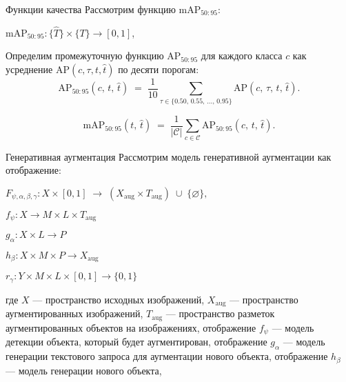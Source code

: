 \documentclass{beamer}
\begin{document}
\begin{frame}{Функции качества}
Рассмотрим функцию $\text{mAP}_{50:95}$:
\begin{center}
   $\text{mAP}_{50:95}:  \{ \hat{T} \}  \times \{ T \} \to [0,1]$,
\end{center}

Определим промежуточную функцию $\text{AP}_{50:95}$ для каждого класса $c$ как усреднение $\text{AP}(c, \tau, t, \hat{t})$ по десяти порогам:
\[
\text{AP}_{50:95}(c,\,t,\,\hat{t})
\;=\;
\frac{1}{10} 
\sum_{\tau \in \{0.50,\,0.55,\,\dots,\,0.95\}}
\text{AP}(c,\,\tau,\,t,\,\hat{t}).
\]

\[
\text{mAP}_{50:95}(t,\,\hat{t})
\;=\;
\frac{1}{|\mathcal{C}|}
\sum_{c \in \mathcal{C}}
\text{AP}_{50:95}(c,\,t,\,\hat{t}).
\]

\end{frame}
\begin{frame}{Генеративная аугментация}
Рассмотрим модель генеративной аугментации как отображение:

\begin{center}

$
F_{\psi,\alpha,\beta,\gamma} : X \times [0,1] \;\longrightarrow\; (X_{\text{aug}} \times T_{\text{aug}}) \;\cup\; \{\varnothing\}, 
$

\end{center}
\begin{center}
$ f_{\psi}: X \to M \times L \times T_{\text{aug}}$
\end{center}
\begin{center}
$ g_{\alpha}: X \times L \to P$
\end{center}
\begin{center}
$ h_{\beta}: X \times M \times P \to X_{\text{aug}}$

\end{center}
\begin{center}
$ r_{\gamma}: Y \times M \times L \times [0,1] \to \{0,1\}$

\end{center}


где $X$ — пространство исходных изображений,  
$X_{\text{aug}}$ — пространство аугментированных изображений, $T_{\text{aug}}$ — пространство разметок аугментированных объектов на изображениях, отображение
$f_{\psi}$ — модель детекции объекта, который будет аугментирован, отображение $g_{\alpha}$ — модель генерации текстового запроса для аугментации нового объекта, отображение $h_{\beta}$ — модель генерации нового объекта,
\end{frame}
\end{document}
